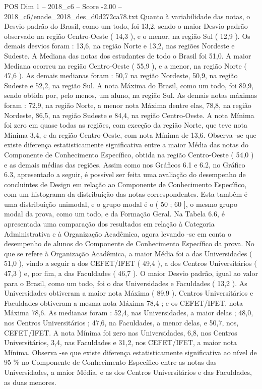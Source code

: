\begin{textsample}{POS Dim 1 – 2018\_c6 – Score -2.00 – 2018\_c6/enade\_2018\_des\_d0d272ca78.txt}
Quanto à variabilidade das notas, o Desvio padrão do Brasil, como um todo, foi 13,2, sendo o maior Desvio padrão observado na região Centro-Oeste ( 14,3 ), e o menor, na região Sul ( 12,9 ).
Os demais desvios foram : 13,6, na região Norte e 13,2, nas regiões Nordeste e Sudeste.
A Mediana das notas dos estudantes de todo o Brasil foi 51,0.
A maior Mediana ocorreu na região Centro-Oeste ( 55,9 ), e a menor, na região Norte ( 47,6 ).
As demais medianas foram : 50,7 na região Nordeste, 50,9, na região Sudeste e 52,2, na região Sul.
A nota Máxima do Brasil, como um todo, foi 89,9, sendo obtida por, pelo menos, um aluno, na região Sul.
As demais notas máximas foram : 72,9, na região Norte, a menor nota Máxima dentre elas, 78,8, na região Nordeste, 86,5, na região Sudeste e 84,4, na região Centro-Oeste.
A nota Mínima foi zero em quase todas as regiões, com exceção da região Norte, que teve nota Mínima 3,4, e da região Centro-Oeste, com nota Mínima de 13,6.
Observa -se que existe diferença estatisticamente significativa entre a maior Média das notas do Componente de Conhecimento Específico, obtida na região Centro-Oeste ( 54,0 ) e as demais médias das regiões.
Assim como nos Gráficos 6.1 e 6.2, no Gráfico 6.3, apresentado a seguir, é possível ser feita uma avaliação do desempenho de concluintes de Design em relação ao Componente de Conhecimento Específico, com um histograma da distribuição das notas correspondentes.
Esta também é uma distribuição unimodal, e o grupo modal é o ( 50 ; 60 ], o mesmo grupo modal da prova, como um todo, e da Formação Geral.
Na Tabela 6.6, é apresentada uma comparação dos resultados em relação à Categoria Administrativa e à Organização Acadêmica, agora levando -se em conta o desempenho de alunos do Componente de Conhecimento Específico da prova.
No que se refere à Organização Acadêmica, a maior Média foi a das Universidades ( 51,0 ), vindo a seguir a dos CEFET/IFET ( 49,4 ), a dos Centros Universitários ( 47,3 ) e, por fim, a das Faculdades ( 46,7 ).
O maior Desvio padrão, igual ao valor para o Brasil, como um todo, foi o das Universidades e Faculdades ( 13,2 ).
As Universidades obtiveram a maior nota Máxima ( 89,9 ).
Centros Universitários e Faculdades obtiveram a mesma nota Máxima 78,4 ; e os CEFET/IFET, nota Máxima 78,6.
As medianas foram : 52,4, nas Universidades, a maior delas ; 48,0, nos Centros Universitários ; 47,6, na Faculdades, a menor delas, e 50,7, nos, CEFET/IFET.
A nota Mínima foi zero nas Universidades, 6,8, nos Centros Universitários, 3,4, nas Faculdades e 31,2, nos CEFET/IFET, a maior nota Mínima.
Observa -se que existe diferença estatisticamente significativa ao nível de 95 \% no Componente de Conhecimento Específico entre as notas das Universidades, a maior Média, e as dos Centros Universitários e das Faculdades, as duas menores.

\end{textsample}
